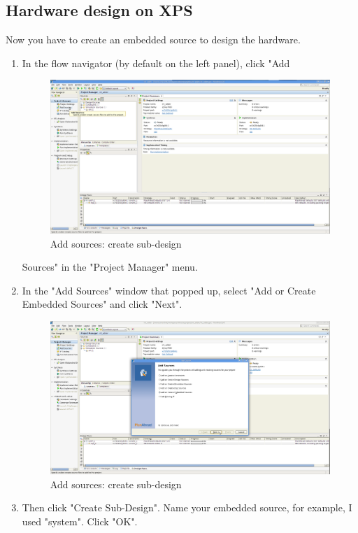 \documentclass{article}
\begin{document}
	\subsection{Hardware design on XPS}
	Now you have to create an embedded source to design the hardware.
	\begin{enumerate}
	\item In the flow navigator (by default on the left panel), click "Add
	\begin{figure}
	\includegraphics[scale=0.25]{pictures/AddSources1.png}
	\caption{Add sources: create sub-design}
	\end{figure}
	Sources" in the "Project Manager" menu.
	\item In the "Add Sources" window that popped up, select "Add or Create
	Embedded Sources" and click "Next".
	\begin{figure}
	\includegraphics[scale=0.25]{pictures/AddSources2.png}
	\caption{Add sources: create sub-design}
	\end{figure}
	\item Then click "Create Sub-Design". Name your embedded source, for
	example, I used "system". Click "OK".
	\begin{figure}

\end{figure}
\end{enumerate}
\end{document}
